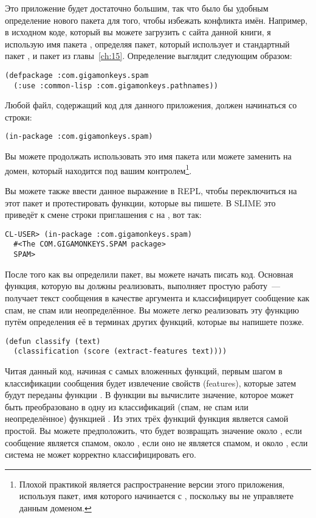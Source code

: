 Это приложение будет достаточно большим, так что было бы удобным определение нового пакета
для того, чтобы избежать конфликта имён.  Например, в исходном коде, который вы можете
загрузить с сайта данной книги, я использую имя пакета ,
определяя пакет, который использует и стандартный пакет , и пакет
 из главы~\ref{ch:15}.  Определение выглядит сле\-дую\-щим
образом:

\begin{lstlisting}
(defpackage :com.gigamonkeys.spam
  (:use :common-lisp :com.gigamonkeys.pathnames))
\end{lstlisting}

Любой файл, содержащий код для данного приложения, должен начинаться со строки:

\begin{lstlisting}
(in-package :com.gigamonkeys.spam)
\end{lstlisting}

Вы можете продолжать использовать это имя пакета или можете заменить
 на домен, который находится под вашим контролем\footnote{Плохой
  практикой является распространение версии этого приложения, используя пакет, имя
  которого начинается с , поскольку вы не управляете данным
  доменом.}.

Вы можете также ввести данное выражение в REPL, чтобы переключиться на этот пакет и
протестировать функции, которые вы пишете.  В SLIME это приведёт к смене строки
приглашения с  на , вот так:

\begin{lstlisting}[style=lisprepl]
  CL-USER> (in-package :com.gigamonkeys.spam)
  #<The COM.GIGAMONKEYS.SPAM package>
  SPAM> 
\end{lstlisting}

После того как вы определили пакет, вы можете начать писать код.  Основная функция,
которую вы должны реализовать, выполняет простую работу~--- получает текст сообщения в
качестве аргумента и классифицирует сообщение как спам, не спам или неопределённое.  Вы
можете легко реализовать эту функцию путём определения её в терминах других функций,
которые вы напишете позже.

\begin{lstlisting}
(defun classify (text)
  (classification (score (extract-features text))))
\end{lstlisting}

Читая данный код, начиная с самых вложенных функций, первым шагом в классификации сообщения
будет извлечение свойств (features), которые затем будут переданы функции .  В
функции  вы вычислите значение, которое может быть преобразовано в одну из
классификаций (спам, не спам или неопределённое) функцией .  Из этих
трёх функций функция  является самой простой. Вы можете
предположить, что  будет возвращать значение около , если сообщение
является спамом, около , если оно не является спамом, и около , если
система не может корректно классифицировать его.

